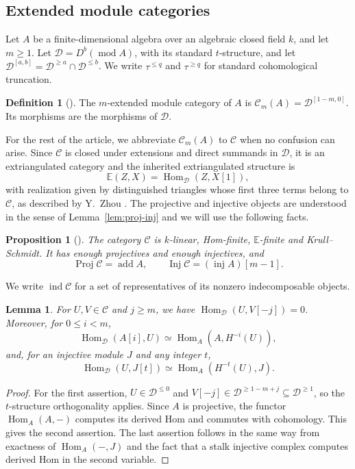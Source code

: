 \documentclass[pdflatex,sn-mathphys-num]{sn-jnl}
\numberwithin{equation}{section}
\newtheorem{proposition}[theorem]{Proposition}
\newtheorem{lemma}[theorem]{Lemma}
\theoremstyle{definition}
\newtheorem{definition}[theorem]{Definition}
\theoremstyle{remark}\newtheorem{remark}[theorem]{Remark}
\newcommand{\C}{\mathcal C}
\newcommand{\D}{\mathcal D}
\newcommand{\E}{\mathbb E}
\newcommand{\Hom}{\operatorname{Hom}}
\newcommand{\ind}{\operatorname{ind}}
\newcommand{\add}{\operatorname{add}}
\newcommand{\modu}{\operatorname{mod}}
\begin{document}
\subsection{Extended module categories}
Let $A$ be a finite-dimensional algebra over an algebraic closed field $k$, and let $m\geq1$.
Let $\D=D^b(\modu A)$, with its standard $t$-structure, and let
$\D^{[a,b]}=\D^{\geq a}\cap\D^{\leq b}$. We write $\tau^{\leq q}$ and $\tau^{\geq q}$ for
standard cohomological truncation.

\begin{definition}[{\cite[Definition 2.2]{Zhou}}]
The $m$-extended module category of $A$ is
$\C_m(A)=\D^{[1-m,0]}$. Its morphisms are the morphisms of $\D$.
\end{definition}

For the rest of the article, we abbreviate $\C_m(A)$ to $\C$ when no
confusion can arise. Since $\C$ is closed under extensions and direct summands
in $\D$, it is an extriangulated category and the inherited extriangulated structure is
\[
 \E(Z,X)=\Hom_{\D}(Z,X[1]),
\]
with realization given by distinguished triangles whose first three terms
belong to $\C$, as described by Y.~Zhou \cite[Remark 1.4]{Zhou}.
The projective and injective objects are understood in the sense of
Lemma~\ref{lem:proj-inj} and we will use the following facts.

\begin{proposition}[{\cite[Lemma 3.1]{Zhou}}]\label{prop:structure}
The category $\C$ is $k$-linear, Hom-finite, $\E$-finite and Krull--Schmidt.
It has enough projectives and enough injectives, and
\[
 \operatorname{Proj}\C=\add A,\qquad
 \operatorname{Inj}\C=(\operatorname{inj}A)[m-1].
\]
\end{proposition}

We write
$\ind\C$ for a set of representatives of its nonzero indecomposable objects.

\begin{lemma}\label{lem:window}
For $U,V\in\C$ and $j\geq m$, we have $\Hom_{\D}(U,V[-j])=0$.
Moreover, for $0\leq i<m$,
\[
 \Hom_{\D}(A[i],U)\simeq\Hom_A(A,H^{-i}(U)),
\]
and, for an injective module $J$ and any integer $t$,
\[
 \Hom_{\D}(U,J[t])\simeq\Hom_A(H^{-t}(U),J).
\]
\end{lemma}
\begin{proof}
For the first assertion, $U\in\D^{\leq0}$ and
$V[-j]\in\D^{\geq1-m+j}\subseteq\D^{\geq1}$, so the $t$-structure
orthogonality applies. Since $A$ is projective, the functor
$\Hom_A(A,-)$ computes its derived Hom and commutes with cohomology.
This gives the second assertion. The last assertion follows in the same
way from exactness of $\Hom_A(-,J)$ and the fact that a stalk injective
complex computes derived Hom in the second variable.
\end{proof}
\end{document}
